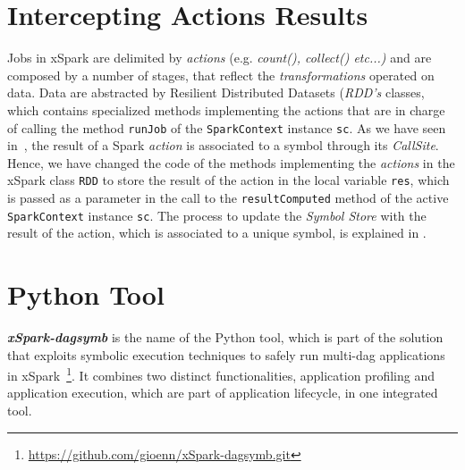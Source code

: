 \section{Intercepting Actions Results}\label{sec:running_jobs}
Jobs in xSpark are delimited by \textit{actions} (e.g. \textit{count(), collect()  etc...)} and are composed by a number of stages, that reflect the \textit{transformations} operated on data. Data are abstracted by Resilient Distributed Datasets (\textit{RDD's} classes, which contains specialized methods implementing the actions that are in charge of calling the method \texttt{runJob} of  the \texttt{SparkContext} instance \texttt{sc}. 
As we have seen in~, the result of a Spark \textit{action} is associated to a symbol through its \textit{CallSite}. Hence, we have changed the code of the methods implementing the \textit{actions} in the xSpark class \texttt{RDD} to store the result of the action in the local variable \texttt{res}, which is passed as a parameter in the call to the \texttt{resultComputed} method of the active \texttt{SparkContext} instance \texttt{sc}. The process to update the \tool \textit{Symbol Store} with the result of the action, which is associated to a unique symbol, is explained in  .  


\section{Python Tool}\label{sec:xspark_dagsymb}

\textbf\textit{xSpark-dagsymb} is the name of the Python tool, which is part of the \tool solution that exploits symbolic execution techniques to safely run multi-dag applications in xSpark~\footnote{\url{https://github.com/gioenn/xSpark-dagsymb.git}}.
It combines two distinct functionalities, application profiling and
application execution, which are part of \tool application lifecycle, in one integrated tool.

